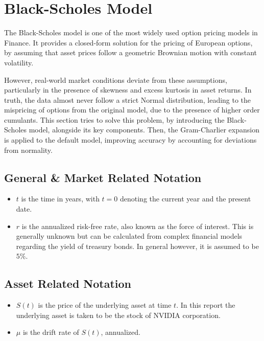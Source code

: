 
\section{Black-Scholes Model}
\label{sec: model}
The Black-Scholes model is one of the most widely used option pricing models in Finance. It provides a closed-form solution for the pricing of European options, by assuming that asset prices follow a geometric Brownian motion with constant volatility.

However, real-world market conditions deviate from these assumptions, particularly in the presence of skewness and excess kurtosis in asset returns. In truth, the data almost never follow a strict Normal distribution, leading to the mispricing of options from the original model, due to the presence of higher order cumulants. This section tries to solve this problem, by introducing the Black-Scholes model, alongside its key components. Then, the Gram-Charlier expansion is applied to the default model, improving accuracy by accounting for deviations from normality.

\subsection{General \& Market Related Notation}
\begin{itemize}
	\item $t$ is the time in years, with $t=0$ denoting the current year and the present date.
	\item $r$ is the annualized risk-free rate, also known as the force of interest. This is generally unknown but can be calculated from complex financial models regarding the yield of treasury bonds. In general however, it is assumed to be $5\%$.
\end{itemize}

\subsection{Asset Related Notation}

\begin{itemize}
	\item $S(t)$ is the price of the underlying asset at time $t$. In this report the underlying asset is taken to be the stock of NVIDIA corporation.
	\item $\mu$ is the drift rate of $S(t)$, annualized.
\end{itemize}

